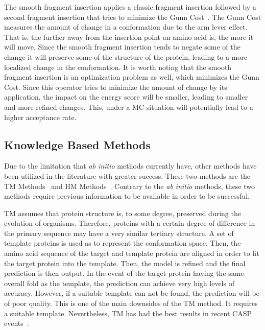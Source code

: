The smooth fragment insertion applies a classic fragment insertion
followed by a second fragment insertion that tries to minimize the
Gunn Cost~\cite{gunn1997sampling}. The Gunn Cost measures the amount of change in a conformation due to the arm lever effect. That is, the further away from
the insertion point an amino acid is, the more it will move. Since
the smooth fragment insertion tends to negate some of the change it will
preserve some of the structure of the protein, leading to a more localized change in the conformation. It is worth noting that the smooth fragment insertion is an optimization problem as well, which minimizes the Gunn Cost.
Since this operator tries to minimize the amount of change by its application,
the impact on the energy score will be smaller, leading to smaller and more refined changes. This, under a \ac{MC} situation will potentially lead to a higher acceptance rate.

\subsection{Knowledge Based Methods}

Due to the limitation that \textit{ab initio} methods currently have, other methods have been utilized in the literature with greater success. These two methods are the \ac{TM} Methods~\cite{dorn2014three} and \ac{HM} Methods~\cite{leach2001molecular}. Contrary to the \textit{ab initio} methods, these two methods require previous information to be available in order to be successful.

\ac{TM} assumes that protein structure is, to some degree, preserved during the evolution of organisms. Therefore, proteins with a certain degree of difference in the primary sequence may have a very similar tertiary structure. A set of template proteins is used as to represent the conformation space. Then, the amino acid sequence of the target and template protein are aligned in order to fit the target protein into the template. Then, the model is refined and the final prediction is then output. In the event of the target protein having the same overall fold as the template, the prediction can achieve very high levels of accuracy. However, if a suitable template can not be found, the prediction will be of poor quality. This is one of the main downsides of the \ac{TM} method. It requires a suitable template. Nevertheless, \ac{TM} has had the best results in recent \ac{CASP} events~\cite{moult2018critical}.

